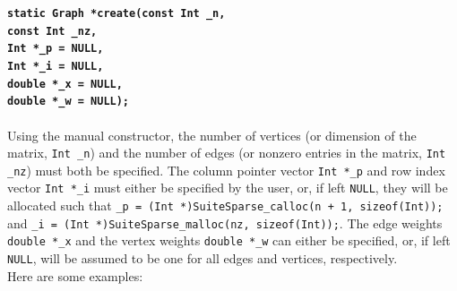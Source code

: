 \documentclass[letter]{article}
\begin{document}
\textbf{\texttt{static Graph *create(const Int \_n, \\
\hspace*{4.2cm} const Int \_nz, \\
\hspace*{4.2cm} Int *\_p = NULL, \\
\hspace*{4.2cm} Int *\_i = NULL, \\
\hspace*{4.2cm} double *\_x = NULL, \\
\hspace*{4.2cm} double *\_w = NULL);}}\\
\\
Using the manual constructor, the number of vertices (or dimension of the matrix, \texttt{Int \_n}) and the number of edges (or nonzero entries in the matrix, \texttt{Int \_nz}) must both be specified. The column pointer vector \texttt{Int *\_p} and row index vector \texttt{Int *\_i} must either be specified by the user, or, if left \texttt{NULL}, they will be allocated such that \texttt{\_p = (Int *)SuiteSparse\_calloc(n + 1, sizeof(Int));} and \texttt{\_i = (Int *)SuiteSparse\_malloc(nz, sizeof(Int));}. The edge weights \texttt{double *\_x} and the vertex weights \texttt{double *\_w} can either be specified, or, if left \texttt{NULL}, will be assumed to be one for all edges and vertices, respectively.\\

Here are some examples:
\end{document}
